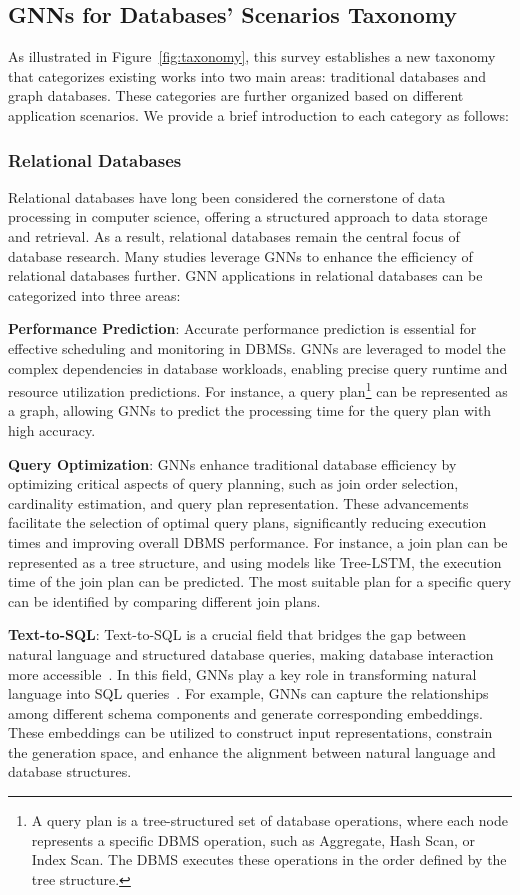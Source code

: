 \subsection{GNNs for Databases' Scenarios Taxonomy}
As illustrated in Figure~\ref{fig:taxonomy}, this survey establishes a new taxonomy that categorizes existing works into two main areas: traditional databases and graph databases. These categories are further organized based on different application scenarios. We provide a brief introduction to each category as follows:

\subsubsection{Relational Databases}  
Relational databases have long been considered the cornerstone of data processing in computer science, offering a structured approach to data storage and retrieval. As a result, relational databases remain the central focus of database research. Many studies leverage GNNs to enhance the efficiency of relational databases further.
GNN applications in relational databases can be categorized into three areas:

\textbf{Performance Prediction}: Accurate performance prediction is essential for effective scheduling and monitoring in DBMSs. GNNs are leveraged to model the complex dependencies in database workloads, enabling precise query runtime and resource utilization predictions. For instance, a query plan\footnote{A query plan is a tree-structured set of database operations, where each node represents a specific DBMS operation, such as Aggregate, Hash Scan, or Index Scan. The DBMS executes these operations in the order defined by the tree structure.} can be represented as a graph, allowing GNNs to predict the processing time for the query plan with high accuracy. 

\textbf{Query Optimization}: GNNs enhance traditional database efficiency by optimizing critical aspects of query planning, such as join order selection, cardinality estimation, and query plan representation. These advancements facilitate the selection of optimal query plans, significantly reducing execution times and improving overall DBMS performance. For instance, a join plan can be represented as a tree structure, and using models like Tree-LSTM, the execution time of the join plan can be predicted. The most suitable plan for a specific query can be identified by comparing different join plans.

\textbf{Text-to-SQL}: Text-to-SQL is a crucial field that bridges the gap between natural language and structured database queries, making database interaction more accessible~\cite{DBLP:journals/corr/abs-2406-07815,DBLP:journals/pvldb/LiLCLT24}. In this field, GNNs play a key role in transforming natural language into SQL queries~\cite{DBLP:journals/corr/abs-2408-05109}. For example, GNNs can capture the relationships among different schema components and generate corresponding embeddings. These embeddings can be utilized to construct input representations, constrain the generation space, and enhance the alignment between natural language and database structures.


